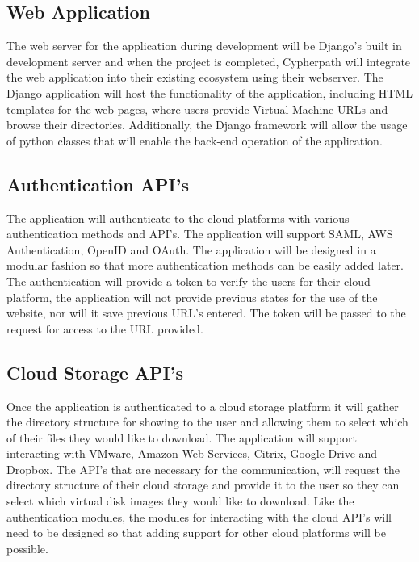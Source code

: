 \documentclass{article}
\begin{document}
        \subsection{Web Application}
        The web server for the application during development will be Django's built in development server and when the project is completed, Cypherpath will integrate
        the web application into their existing ecosystem using their webserver. The Django application will host the functionality of the application, including HTML templates for the 
        web pages, where users provide Virtual Machine URLs and browse their directories. Additionally, the Django framework will allow the usage of python classes that will enable the 
        back-end operation of the application.

        
        \subsection{Authentication API's}
        The application will authenticate to the cloud platforms with various authentication methods and API's. The application will support
        SAML, AWS Authentication, OpenID and OAuth. The application will be designed in a modular fashion so that more authentication methods can be easily added later.
        The authentication will provide a token to verify the users for their cloud platform, the application will not provide previous states for the use of the 
        website, nor will it save previous URL's entered. The token will be passed to the request for access to the URL provided.


        \subsection{Cloud Storage API's}
        Once the application is authenticated to a cloud storage platform it will gather the directory structure for showing to the user and allowing them to select
        which of their files they would like to download. The application will support interacting with VMware, Amazon Web Services, Citrix, Google Drive and Dropbox. The API's
        that are necessary for the communication, will request the directory structure of their cloud storage and provide it to the user so they can select which virtual disk
        images they would like to download. Like the authentication modules, the modules
        for interacting with the cloud API's will need to be designed so that adding support for other cloud platforms will be possible.
\end{document}
